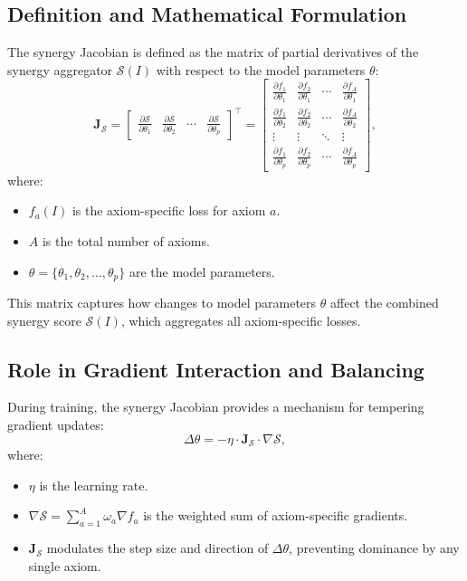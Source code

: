 \subsection{Definition and Mathematical Formulation}
The synergy Jacobian is defined as the matrix of partial derivatives of the synergy aggregator \(\mathcal{S}(I)\) with respect to the model parameters \(\theta\):
\[
\mathbf{J}_{\mathcal{S}} = 
\begin{bmatrix}
\frac{\partial \mathcal{S}}{\partial \theta_1} & \frac{\partial \mathcal{S}}{\partial \theta_2} & \cdots & \frac{\partial \mathcal{S}}{\partial \theta_p}
\end{bmatrix}^\top
=
\begin{bmatrix}
\frac{\partial f_1}{\partial \theta_1} & \frac{\partial f_2}{\partial \theta_1} & \cdots & \frac{\partial f_A}{\partial \theta_1} \\
\frac{\partial f_1}{\partial \theta_2} & \frac{\partial f_2}{\partial \theta_2} & \cdots & \frac{\partial f_A}{\partial \theta_2} \\
\vdots & \vdots & \ddots & \vdots \\
\frac{\partial f_1}{\partial \theta_p} & \frac{\partial f_2}{\partial \theta_p} & \cdots & \frac{\partial f_A}{\partial \theta_p}
\end{bmatrix},
\]
where:
\begin{itemize}
    \item \(f_a(I)\) is the axiom-specific loss for axiom \(a\).
    \item \(A\) is the total number of axioms.
    \item \(\theta = \{\theta_1, \theta_2, \dots, \theta_p\}\) are the model parameters.
\end{itemize}

This matrix captures how changes to model parameters \(\theta\) affect the combined synergy score \(\mathcal{S}(I)\), which aggregates all axiom-specific losses.


\subsection{Role in Gradient Interaction and Balancing}
During training, the synergy Jacobian provides a mechanism for tempering gradient updates:
\[
\Delta \theta = -\eta \cdot \mathbf{J}_{\mathcal{S}} \cdot \nabla \mathcal{S},
\]
where:
\begin{itemize}
    \item \(\eta\) is the learning rate.
    \item \(\nabla \mathcal{S} = \sum_{a=1}^A \omega_a \nabla f_a\) is the weighted sum of axiom-specific gradients.
    \item \(\mathbf{J}_{\mathcal{S}}\) modulates the step size and direction of \(\Delta \theta\), preventing dominance by any single axiom.
\end{itemize}


